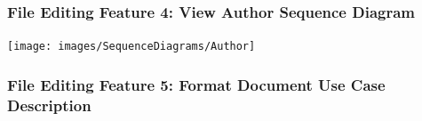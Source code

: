 \documentclass[twoside,letterpaper]{article}
\begin{document}
\subsubsection[File Editing Feature 4: View Author Sequence Diagram]{\rmfamily\bfseries\color{black}
	File Editing Feature 4: View Author Sequence Diagram}
\hypertarget{RefHeading22059017292}{}

\bigskip

\texttt{[image: images/SequenceDiagrams/Author]}

\newpage

\subsubsection[File Editing Feature 5: Format Document]{\rmfamily\bfseries\color{black}
	File Editing Feature 5: Format Document Use Case Description}
\hypertarget{RefHeading22059017292}{}
\end{document}
